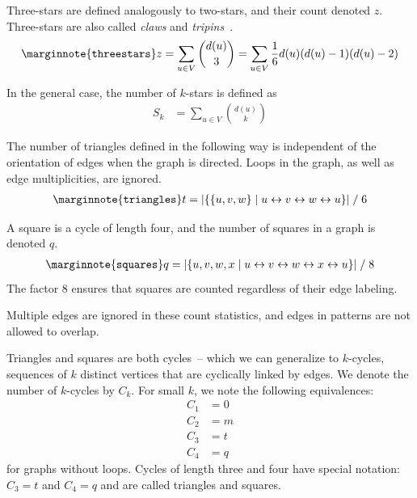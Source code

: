 \documentclass{article}
\begin{document}
Three-stars are defined analogously to two-stars, and their count
denoted $z$.  Three-stars are also called \emph{claws} and
\emph{tripins}~\cite{b853}.   
\begin{align}
  \marginnote{\texttt{threestars}}
  z = \sum_{u \in V} {d(u) \choose 3} = \sum_{u \in V} \frac 1 6 d(u)
  (d(u) - 1) (d(u) - 2)
\end{align}

In the general case, the number of $k$-stars is defined as
\begin{align}
  S_k &= \sum_{u \in V} {d(u) \choose k}
\end{align}

The number of
triangles defined in the following way is independent of the orientation
of edges when the graph is directed.  Loops in the graph, as well as
edge multiplicities, are ignored.
\begin{align}
  \marginnote{\texttt{triangles}}
  t = | \{ \{u, v, w\} \mid u \leftrightarrow v \leftrightarrow w \leftrightarrow u \} | \;/\; 6
\end{align}

A square is a cycle of length four, and the number of squares in a graph
is denoted $q$.
\begin{align}
  \marginnote{\texttt{squares}}
  q = | \{ u, v, w, x \mid u \leftrightarrow v \leftrightarrow w \leftrightarrow x \leftrightarrow u \} | \;/\; 8
\end{align}
The factor 8 ensures that squares are counted regardless of their edge
labeling.  

Multiple edges are ignored in these count statistics, and edges in
patterns are not allowed to overlap. 

Triangles and squares are both cycles~-- which we can generalize to
$k$-cycles, sequences of $k$ distinct vertices that are cyclically
linked by edges.  We denote the number of $k$-cycles by $C_k$. 
For small $k$, we note the following equivalences: 
\begin{align*}
  C_1 &= 0 \\
  C_2 &= m \\
  C_3 &= t \\
  C_4 &= q
\end{align*}
for graphs without loops.  Cycles of length three and four have special
notation:  $C_3 = t$ and $C_4 = q$ and are called triangles and
squares. 
\end{document}
